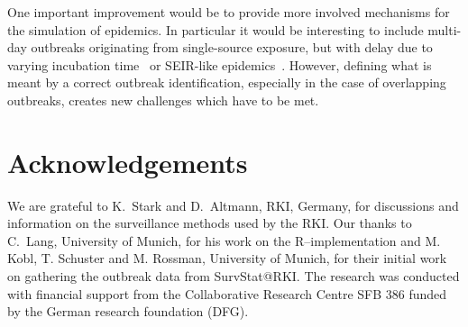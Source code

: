 \documentclass[a4paper,11pt]{article}
\begin{document}
One important improvement would be to provide more involved mechanisms
for the simulation of epidemics. In particular it would be interesting
to include multi-day outbreaks originating from single-source
exposure, but with delay due to varying incubation
time~\citep{hutwagner2005} or SEIR-like
epidemics~\citep{andersson2000}. However, defining what is meant by a
correct outbreak identification, especially in the case of overlapping
outbreaks, creates new challenges which have to be met.

\section{Acknowledgements}
We are grateful to K.\ Stark and D.\ Altmann, RKI, Germany, for
discussions and information on the surveillance methods used by the
RKI. Our thanks to C.\ Lang, University of Munich, for his work on the
R--implementation and M.  Kobl, T.  Schuster and M. Rossman,
University of Munich, for their initial work on gathering the outbreak
data from SurvStat@RKI. The research was conducted with financial
support from the Collaborative Research Centre SFB 386 funded by the
German research foundation (DFG).



\end{document}
